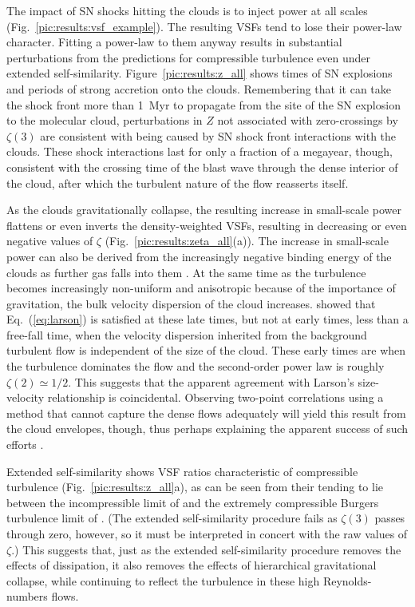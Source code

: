 \documentclass{aa}		%
\begin{document}
The impact of SN shocks hitting the clouds is to inject power at all scales (Fig.~\ref{pic:results:vsf_example}). 
The resulting VSFs tend to lose their power-law character. Fitting a power-law to them anyway results in substantial perturbations from the predictions for compressible turbulence even under extended self-similarity.
Figure~\ref{pic:results:z_all} shows times of SN explosions and periods of strong accretion onto the clouds. 
Remembering that it can take the shock front more than 1~Myr to propagate from the site of the SN explosion to the molecular cloud, perturbations in $Z$ not associated with zero-crossings by $\zeta(3)$ are consistent with being caused by SN shock front interactions with the clouds.  
These shock interactions last for only a fraction of a megayear, though, consistent with the crossing time of the blast wave through the dense interior of the cloud, after which the turbulent nature of the flow reasserts itself.

As the clouds gravitationally collapse, the resulting increase in small-scale power flattens or even inverts the density-weighted VSFs, resulting in decreasing or even negative values of $\zeta$ (Fig.~\ref{pic:results:zeta_all}(a)). The increase in small-scale power can also be derived from the increasingly negative binding energy of the clouds as further gas falls into them . 
At the same time as the turbulence becomes increasingly non-uniform and anisotropic because of the importance of gravitation, the bulk velocity dispersion of the cloud increases.
 showed that Eq.~(\ref{eq:larson}) is satisfied at these late times, but not at early times, less than a free-fall time, when the velocity dispersion inherited from the background turbulent flow is independent of the size of the cloud. 
These early times are when the turbulence dominates the flow and the second-order power law is roughly $\zeta(2) \simeq 1/2$.
This suggests that the apparent agreement with Larson's size-velocity relationship is coincidental. Observing two-point correlations using a method that cannot capture the dense flows adequately will yield this result from the cloud envelopes, though, thus perhaps explaining the apparent success of such efforts \citep[][Fig.\ 9 shows how these different interpretations can arise]{Goodman1998}.

Extended self-similarity shows VSF ratios characteristic of compressible turbulence (Fig.~\ref{pic:results:z_all}a), as can be seen from their tending to lie between the incompressible limit of \citet{She1994} and the extremely compressible Burgers turbulence limit of \citet{Boldyrev2002}.
(The extended self-similarity procedure fails as $\zeta(3)$ passes through zero, however, so it must be interpreted in concert with the raw values of $\zeta$.)
This suggests that, just as the extended self-similarity procedure removes the effects of dissipation, it also removes the effects of hierarchical gravitational collapse, while continuing to reflect the turbulence in these high Reynolds-numbers flows.
\end{document}
